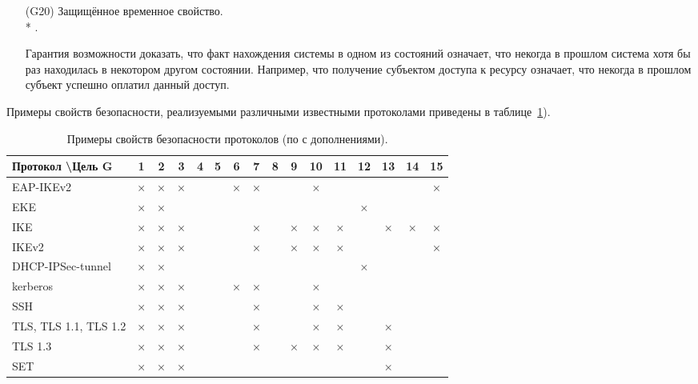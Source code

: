 \begin{itemize}
	\item[(G20)] Защищённое временное свойство.\\*
		.
	\item[{}] Гарантия возможности доказать, что факт нахождения системы в одном из состояний означает, что некогда в прошлом система хотя бы раз находилась в некотором другом состоянии. Например, что получение субъектом доступа к ресурсу означает, что некогда в прошлом субъект успешно оплатил данный доступ.

\end{itemize}

Примеры свойств безопасности, реализуемыми различными известными протоколами приведены в таблице~\ref{tab:protocols-properties}).

\begin{landscape}
{\renewcommand{\arraystretch}{1.5}
\begin{table}
    \centering
    \begin{tabular}{|l|c|c|c|c|c|c|c|c|c|c|c|c|c|c|c|}
        \hline
Протокол \textbackslash Цель G & 1 & 2 & 3 & 4 & 5 & 6 & 7 & 8 & 9 & 10 & 11 & 12 & 13 & 14 & 15 \\
        \hline
        EAP-IKEv2              & × & × & × &   &   & × & × &   &   &  × &    &    &    &    &  × \\
        \hline
        EKE                    & × & × &   &   &   &   &   &   &   &    &    &  × &    &    &    \\
        \hline
        IKE                    & × & × & × &   &   &   & × &   & × &  × &  × &    &  × &  × &  × \\
        \hline
        IKEv2                  & × & × & × &   &   &   & × &   & × &  × &  × &    &    &    &  × \\
        \hline
        DHCP-IPSec-tunnel      & × & × &   &   &   &   &   &   &   &    &    &  × &    &    &    \\
        \hline
        kerberos               & × & × & × &   &   & × & × &   &   &  × &    &    &    &    &    \\
        \hline
        SSH                    & × & × & × &   &   &   & × &   &   &  × &  × &    &    &    &    \\
        \hline
        TLS, TLS 1.1, TLS 1.2  & × & × & × &   &   &   & × &   &   &  × &  × &    &  × &    &    \\
        \hline
        TLS 1.3                & × & × & × &   &   &   & × &   & × &  × &  × &    &  × &    &    \\
        \hline
        SET                    & × & × & × &   &   &   &   &   &   &    &    &    &  × &    &    \\
        \hline
    \end{tabular}
    \caption{Примеры свойств безопасности протоколов (по \cite{Cheremushkin:2009} с дополнениями).}
    \label{tab:protocols-properties}
\end{table}
}
\end{landscape}
